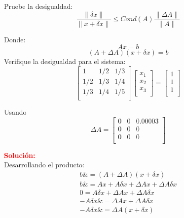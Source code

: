 Pruebe la desigualdad:\\
\begin{equation}
    \frac{\| \delta x \|}{\| x + \delta x \|} \leq Cond(A)\frac{\| \Delta A\|}{\| A\|}  
\end{equation}

Donde: 
$$Ax=b$$
$$(A + \Delta A)(x + \delta x) = b$$
Verifique la desigualdad para el sistema:
$$
    \begin{bmatrix}
       1 & 1/2 & 1/3\\
       1/2 & 1/3 & 1/4 \\
       1/3 & 1/4 & 1/5 \\
    \end{bmatrix}
    \begin{bmatrix}
       x_1 \\
       x_2 \\
       x_3 \\
    \end{bmatrix}=
    \begin{bmatrix}
       1 \\
       1 \\
       1 \\
    \end{bmatrix}$$
   
    Usando 
    $$\Delta A= \begin{bmatrix}
       0 & 0 & 0.00003 \\
       0 & 0 & 0 \\
       0 & 0 & 0 \\
    \end{bmatrix}$$

\noindent \textcolor{red}{\bf Solución:}\\
Desarrollando el producto:
\begin{align}
    b \&= (A + \Delta A)(x + \delta x)  \\
    b \&= Ax+A\delta x+\Delta Ax+\Delta A\delta x \nonumber \\
    0=A\delta x+\Delta Ax+\Delta A\delta x \nonumber \\
    -A\delta x \&= \Delta Ax+\Delta A\delta x \nonumber\\
    -A\delta x \&= \Delta A(x+\delta x) \nonumber
\end{align}

